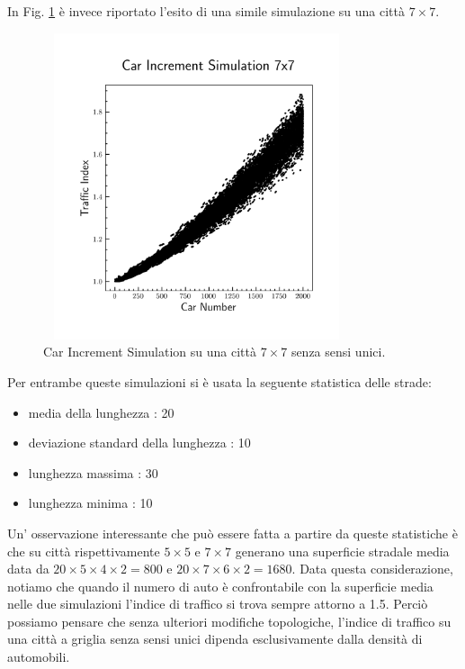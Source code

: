 \documentclass[main.tex]{subfiles}
\begin{document}
        In Fig. \ref{fig:4} è invece riportato l'esito di una simile simulazione su una città $7 \times 7$.
        \begin{figure}[H]
            \centering
            \includegraphics[width=9cm, height=9cm]{car_increment7x7.png}
            \caption{Car Increment Simulation su una città $7 \times 7$ senza sensi unici.}
            \label{fig:4}
        \end{figure}

        Per entrambe queste simulazioni si è usata la seguente statistica delle strade:
        \begin{itemize}
            \item media della lunghezza : 20
            \item deviazione standard della lunghezza : 10
            \item lunghezza massima : 30
            \item lunghezza minima : 10
        \end{itemize}

        Un' osservazione interessante che può essere fatta a partire da queste statistiche è che su città rispettivamente
        $5 \times 5$ e $7 \times 7$ generano una superficie stradale media data da $20 \times 5 \times 4 \times 2 = 800$ e
        $20 \times 7 \times 6 \times 2 = 1680$. Data questa considerazione, notiamo che quando il numero di auto è confrontabile con 
        la superficie media nelle due simulazioni l'indice di traffico si trova sempre attorno a 1.5.
        Perciò possiamo pensare che senza ulteriori modifiche topologiche, l'indice di traffico su una città a griglia
        senza sensi unici dipenda esclusivamente dalla densità di automobili.
\end{document}
